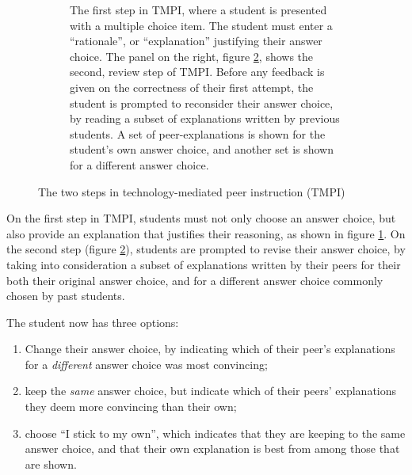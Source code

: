 \documentclass[notitlepage,12pt]{jedm}
\begin{document}
\begin{figure}
	\begin{subfigure}[b]{0.4\textwidth}
		\def\svgscale{0.50}
		
		\caption{
			The first step in TMPI, where a student is presented with a 
			multiple choice item. The student must enter a ``rationale'', or 
			``explanation'' justifying their answer choice.
			\newline
			\newline
			The panel on the right, figure \protect\ref{fig:question_review}, 
			shows the second, review step of TMPI.
			Before any feedback is given on the correctness of their first 
			attempt, the student is prompted to reconsider their answer choice, 
			by reading a subset of explanations written by previous students.
			A set of peer-explanations is shown for the student's own answer 
			choice, and another set is shown for a different answer choice. 
		}
		\label{fig:question_start}
	\end{subfigure}
	\qquad
	\begin{subfigure}[b]{0.6\textwidth}
		\def\svgscale{0.50}
		
		\caption{}
		\label{fig:question_review}
	\end{subfigure}
	\caption{The two steps in technology-mediated peer 
		instruction (TMPI)}
	\label{fig:tmpi}
\end{figure}

On the first step in TMPI, students must not only choose an answer choice, but 
also provide an explanation that justifies their reasoning, as shown in figure 
\ref{fig:question_start}.
On the second step (figure \ref{fig:question_review}), students are prompted to 
revise their answer choice, by taking into consideration a subset of 
explanations written by their peers for their both their original answer 
choice, and for a different answer choice commonly chosen by past students.


The student now has three options:
\begin{enumerate}
	\item Change their answer choice, by indicating which of their peer's 
	explanations for a \textit{different} answer choice was most convincing;
	\item keep the \textit{same} answer choice, but indicate which of their 
	peers' explanations they deem more convincing than their own;
	\item choose ``I stick to my own'', which indicates that they are keeping 
	to the same answer choice, and that their own explanation is best from 
	among those that are shown.
\end{enumerate}
\end{document}
